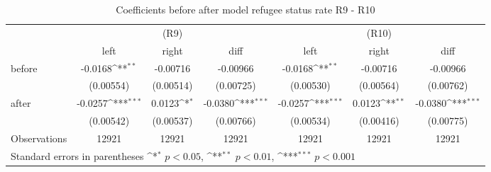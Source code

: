 \begin{table}[!ht]\centering \footnotesize
\def\sym#1{\ifmmode^{#1}\else\(^{#1}\)\fi}
\caption{Coefficients before after model refugee status rate R9 - R10}
\begin{tabular}{l*{6}{c}}
\hline\hline
                    &\multicolumn{3}{c}{(R9)}&\multicolumn{3}{c}{(R10)}\\
&\multicolumn{1}{c}{left}&\multicolumn{1}{c}{right}&\multicolumn{1}{c}{diff}&\multicolumn{1}{c}{left}&\multicolumn{1}{c}{right}&\multicolumn{1}{c}{diff}\\
\hline
before              &     -0.0168\sym{**} &    -0.00716         &    -0.00966         &     -0.0168\sym{**} &    -0.00716         &    -0.00966         \\
                    &   (0.00554)         &   (0.00514)         &   (0.00725)         &   (0.00530)         &   (0.00564)         &   (0.00762)         \\
[0,5em]
after               &     -0.0257\sym{***}&      0.0123\sym{*}  &     -0.0380\sym{***}&     -0.0257\sym{***}&      0.0123\sym{**} &     -0.0380\sym{***}\\
                    &   (0.00542)         &   (0.00537)         &   (0.00766)         &   (0.00534)         &   (0.00416)         &   (0.00775)         \\
\hline
Observations        &       12921         &       12921         &       12921         &       12921         &       12921         &       12921         \\
\hline\hline
\multicolumn{7}{l}{\footnotesize Standard errors in parentheses \sym{*} \(p<0.05\), \sym{**} \(p<0.01\), \sym{***} \(p<0.001\)}\\
\end{tabular}
\end{table}

